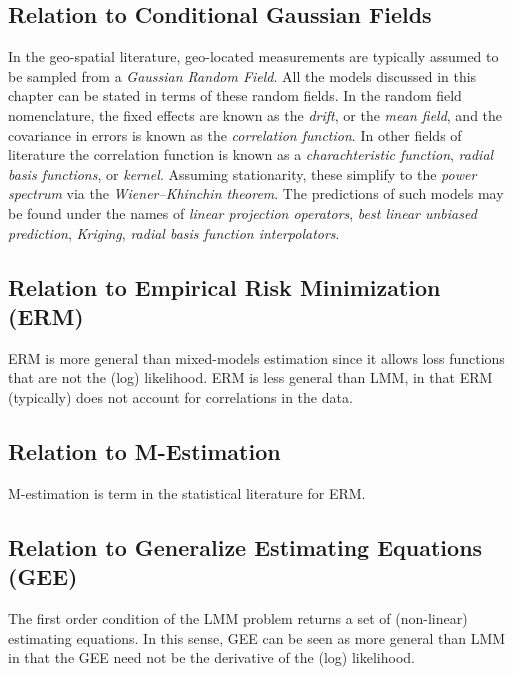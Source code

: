 \documentclass[]{book}
\theoremstyle{definition}
\theoremstyle{definition}
\theoremstyle{definition}
\theoremstyle{remark}
\begin{document}
\subsection{Relation to Conditional Gaussian
Fields}\label{relation-to-conditional-gaussian-fields}

In the geo-spatial literature, geo-located measurements are typically
assumed to be sampled from a \emph{Gaussian Random Field}. All the
models discussed in this chapter can be stated in terms of these random
fields. In the random field nomenclature, the fixed effects are known as
the \emph{drift}, or the \emph{mean field}, and the covariance in errors
is known as the \emph{correlation function}. In other fields of
literature the correlation function is known as a \emph{charachteristic
function}, \emph{radial basis functions}, or \emph{kernel}. Assuming
stationarity, these simplify to the \emph{power spectrum} via the
\emph{Wiener--Khinchin theorem}. The predictions of such models may be
found under the names of \emph{linear projection operators}, \emph{best
linear unbiased prediction}, \emph{Kriging}, \emph{radial basis function
interpolators}.

\subsection{Relation to Empirical Risk Minimization
(ERM)}\label{relation-to-empirical-risk-minimization-erm}

ERM is more general than mixed-models estimation since it allows loss
functions that are not the (log) likelihood. ERM is less general than
LMM, in that ERM (typically) does not account for correlations in the
data.

\subsection{Relation to M-Estimation}\label{relation-to-m-estimation}

M-estimation is term in the statistical literature for ERM.

\subsection{Relation to Generalize Estimating Equations
(GEE)}\label{relation-to-generalize-estimating-equations-gee}

The first order condition of the LMM problem returns a set of
(non-linear) estimating equations. In this sense, GEE can be seen as
more general than LMM in that the GEE need not be the derivative of the
(log) likelihood.
\end{document}
